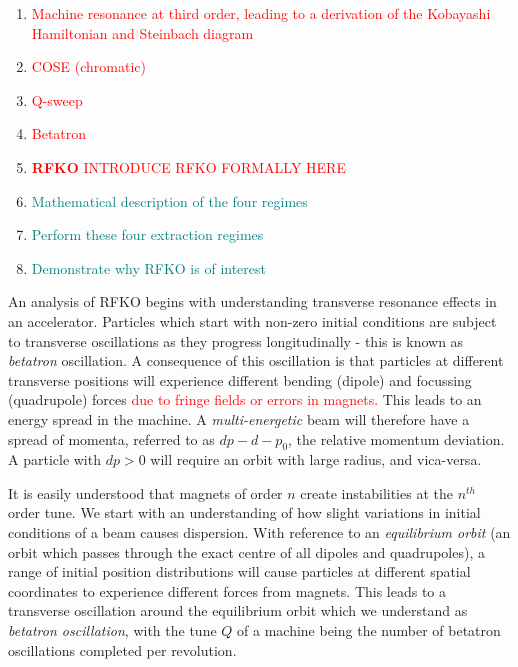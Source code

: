 \documentclass[11pt]{report}
\newcommand\todo[1]{\textcolor{red}{#1}}
\begin{document}
\begin{enumerate}
  \item \todo{Machine resonance at third order, leading to a derivation of the Kobayashi Hamiltonian and Steinbach diagram}
  \item \todo{COSE (chromatic)}
  \item \todo{Q-sweep}
  \item \todo{Betatron}
  \item \todo{\textbf{RFKO} INTRODUCE RFKO FORMALLY HERE}
  \item \textcolor{teal}{Mathematical description of the four regimes}
  \item \textcolor{teal}{Perform these four extraction regimes}
  \item \textcolor{teal}{Demonstrate why RFKO is of interest}
\end{enumerate}

An analysis of RFKO begins with understanding transverse resonance effects in an accelerator. Particles which start with non-zero initial conditions are subject to transverse oscillations as they progress longitudinally - this is known as {\it betatron} oscillation. A consequence of this oscillation is that particles at different transverse positions will experience different bending (dipole) and focussing (quadrupole) forces \textcolor{red}{due to fringe fields or errors in magnets.} This leads to an energy spread in the machine. A {\it multi-energetic} beam will therefore have a spread of momenta, referred to as $dp-d-p_0$, the relative momentum deviation. A particle with $dp>0$ will require an orbit with large radius, and vica-versa.

It is easily understood that magnets of order $n$ create instabilities at the $n^{{th}}$ order tune. We start with an understanding of how slight variations in initial conditions of a beam causes dispersion. With reference to an {\it equilibrium orbit} (an orbit which passes through the exact centre of all dipoles and quadrupoles), a range of initial position distributions will cause particles at different spatial coordinates to experience different forces from magnets. This leads to a transverse oscillation around the equilibrium orbit which we understand as {\it betatron oscillation}, with the tune $Q$ of a machine being the number of betatron oscillations completed per revolution.
\end{document}
